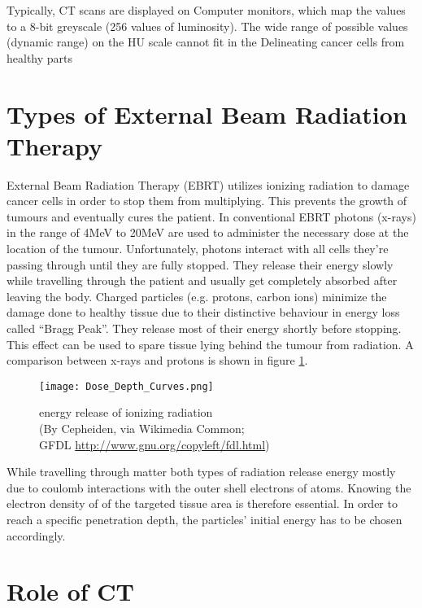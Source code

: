 Typically, CT scans are displayed on Computer monitors, which map the values to a 8-bit greyscale (256 values of luminosity).
The wide range of possible values (dynamic range) on the HU scale cannot fit in the 
Delineating cancer cells from healthy parts 


\section{Types of External Beam Radiation Therapy}
External Beam Radiation Therapy (EBRT) utilizes ionizing radiation to damage cancer cells in order to stop them from multiplying.
This prevents the growth of tumours and eventually cures the patient. 
In conventional EBRT photons (x-rays) in the range of 4MeV to 20MeV are used to administer the necessary dose at the location of the tumour. Unfortunately, photons interact with all cells
they're passing through until they are fully stopped. They release their energy slowly while travelling through the patient and usually get completely absorbed after leaving the body.
Charged particles (e.g. protons, carbon ions) minimize the damage done to healthy tissue due to their distinctive behaviour in energy loss called ``Bragg Peak''.
They release most of their energy shortly before stopping. \cite{Nakamura2010} This effect can be used to spare tissue lying behind the tumour from radiation. \cite{Paganetti2005} %
A comparison between x-rays and protons is shown in figure \ref{fig:bragg}.

\begin{figure}[!h]
	\centering
	\texttt{[image: Dose\_Depth\_Curves.png]}
	\caption{energy release of ionizing radiation \\(By Cepheiden, via Wikimedia Common;\\ GFDL \url{http://www.gnu.org/copyleft/fdl.html})}
	\label{fig:bragg}
\end{figure}

While travelling through matter both types of radiation release energy mostly due to coulomb interactions with the outer shell electrons of atoms.
Knowing the electron density of of the targeted tissue area is therefore essential. In order to reach a specific penetration depth, the particles' initial energy has to be chosen accordingly.

\section{Role of CT}

